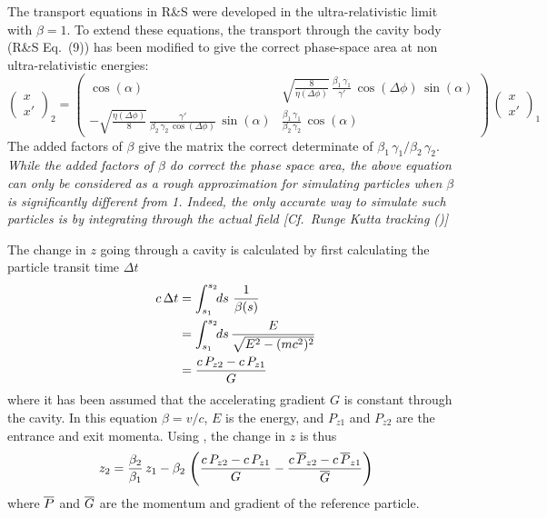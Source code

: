 The transport equations in R\&S were developed in the
ultra-relativistic limit with $\beta = 1$.  To extend these equations,
the transport through the cavity body (R\&S Eq.~(9)) has been modified
to give the correct phase-space area at non ultra-relativistic
energies:
\begin{equation}
  \begin{pmatrix}
    x \\ 
    x'
  \end{pmatrix}_2 = 
  \begin{pmatrix}
    \cos(\alpha)  &  
    \sqrt{\frac{8}{\eta(\Delta\phi)}} \, \frac{\beta_1 \, \gamma_1}{\gamma'} \, 
                                                   \cos(\Delta\phi) \, \sin(\alpha) \\
    -\sqrt{\frac{\eta(\Delta\phi)}{8}} \, 
                     \frac{\gamma'}{\beta_2 \, \gamma_2 \, \cos(\Delta\phi)} \, \sin(\alpha) &
    \frac{\beta_1 \, \gamma_1}{\beta_2 \, \gamma_2} \, \cos(\alpha)
  \end{pmatrix}
  \,
  \begin{pmatrix}
    x \\ 
    x'
  \end{pmatrix}_1
\end{equation}
The added factors of $\beta$ give the matrix the correct determinate
of $\beta_1 \, \gamma_1 / \beta_2 \, \gamma_2$. {\em While the added
factors of $\beta$ do correct the phase space area, the above equation
can only be considered as a rough approximation for simulating
particles when $\beta$ is significantly different from 1. Indeed, the
only accurate way to simulate such particles is by integrating through
the actual field [Cf.~Runge Kutta tracking ()]}

The change in $z$ going through a cavity is calculated by first calculating the particle
transit time $\Delta t$
\begin{align}
  c \, \Delta t &= \int_{s_1}^{s_2} \!\! ds \,\, \frac{1}{\beta(s)} \nonumber \\
  &= \int_{s_1}^{s_2} \!\! ds \, \frac{E}{\sqrt{E^2 - (mc^2)^2}} \\
  &= \frac{c \, P_{z2} - c \, P_{z1}}{G} \nonumber
\end{align}
where it has been assumed that the accelerating gradient $G$ is
constant through the cavity. In this equation $\beta = v / c$, $E$ is
the energy, and $P_{z1}$ and $P_{z2}$ are the entrance and exit
momenta. Using , the change in $z$ is thus
\begin{equation}
  z_2 = \frac{\beta_2}{\beta_1} \, z_1 - 
  \beta_2 \, 
  \left(
  \frac{c \, P_{z2} - c \, P_{z1}}{G} - 
  \frac{c \, \overline{P}_{z2} - c \, \overline{P}_{z1}}{\overline{G}}
  \right)
\end{equation}
where $\overline{P}$ and $\overline{G}$ are the momentum and gradient of the
reference particle.

